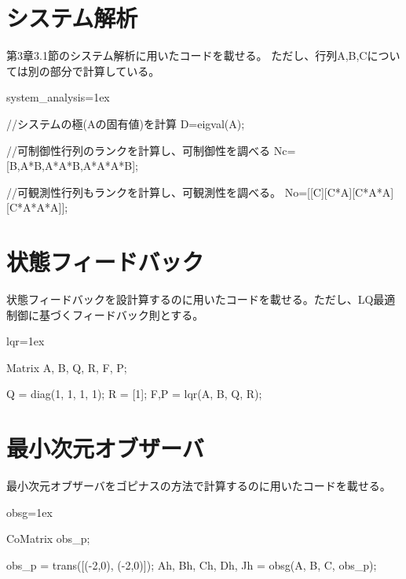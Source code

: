 \section{システム解析}
	第3章3.1節のシステム解析に用いたコードを載せる。
	ただし、行列A,B,Cについては別の部分で計算している。
	\begin{breakitembox}[l]{system\_analysis}\baselineskip=1ex
		\begin{verbatimtab}[4]
		
//システムの極(Aの固有値)を計算
D=eigval(A);

//可制御性行列のランクを計算し、可制御性を調べる
Nc=[B,A*B,A*A*B,A*A*A*B];

//可観測性行列もランクを計算し、可観測性を調べる。
No=[[C][C*A][C*A*A][C*A*A*A]];
		\end{verbatimtab}
	\end{breakitembox}
\section{状態フィードバック}
	状態フィードバックを設計算するのに用いたコードを載せる。ただし、LQ最適制御に基づくフィードバック則とする。
	\begin{breakitembox}[l]{lqr}\baselineskip=1ex
		\begin{verbatimtab}[4]
		
Matrix A, B, Q, R, F, P;

Q = diag(1, 1, 1, 1);
R = [1];
{F,P} = lqr(A, B, Q, R);
		\end{verbatimtab}
	\end{breakitembox}
\section{最小次元オブザーバ}
	最小次元オブザーバをゴピナスの方法で計算するのに用いたコードを載せる。
	\begin{breakitembox}[l]{obsg}\baselineskip=1ex
		\begin{verbatimtab}[4]
		
CoMatrix obs_p;

obs_p = trans([(-2,0), (-2,0)]);
{Ah, Bh, Ch, Dh, Jh} = obsg(A, B, C, obs_p);
		\end{verbatimtab}
	\end{breakitembox}
